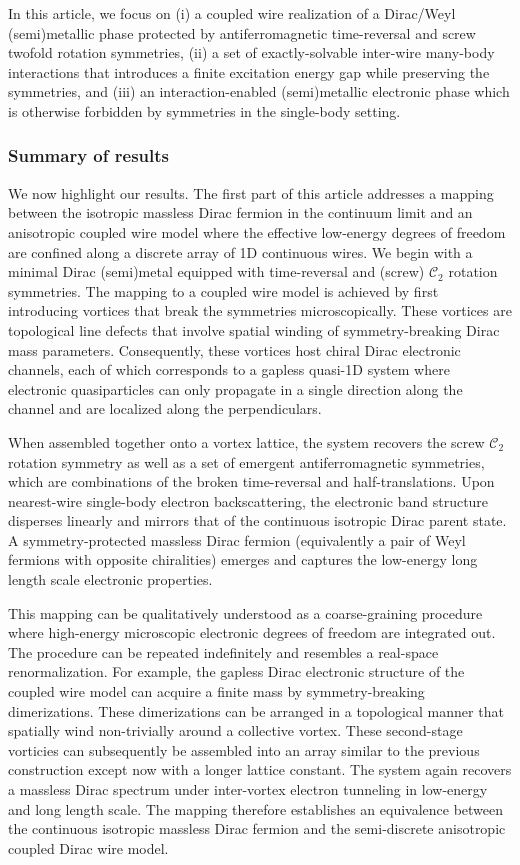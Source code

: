 In this article, we focus on (i) a coupled wire realization of a Dirac/Weyl (semi)metallic phase protected by antiferromagnetic time-reversal and screw twofold rotation symmetries, (ii) a set of exactly-solvable inter-wire many-body interactions that introduces a finite excitation energy gap while preserving the symmetries, and (iii) an interaction-enabled (semi)metallic electronic phase which is otherwise forbidden by symmetries in the single-body setting.

\subsubsection{Summary of results}\label{sec:introsummary}

We now highlight our results. The first part of this article addresses a mapping between the isotropic massless Dirac fermion in the continuum limit and an anisotropic coupled wire model where the effective low-energy degrees of freedom are confined along a discrete array of 1D continuous wires. We begin with a minimal Dirac (semi)metal equipped with time-reversal and (screw) $\mathcal{C}_2$ rotation symmetries. The mapping to a coupled wire model is achieved by first introducing vortices that break the symmetries microscopically. These vortices are topological line defects that involve spatial winding of symmetry-breaking Dirac mass parameters. Consequently, these vortices host chiral Dirac electronic channels, each of which corresponds to a gapless quasi-1D system where electronic quasiparticles can only propagate in a single direction along the channel and are localized along the perpendiculars. 

When assembled together onto a vortex lattice, the system recovers the screw $\mathcal{C}_2$ rotation symmetry as well as a set of emergent antiferromagnetic symmetries, which are combinations of the broken time-reversal and half-translations. Upon nearest-wire single-body electron backscattering, the electronic band structure disperses linearly and mirrors that of the continuous isotropic Dirac parent state. A symmetry-protected massless Dirac fermion (equivalently a pair of Weyl fermions with opposite chiralities) emerges and captures the low-energy long length scale electronic properties.

This mapping can be qualitatively understood as a coarse-graining procedure where high-energy microscopic electronic degrees of freedom are integrated out. The procedure can be repeated indefinitely and resembles a real-space renormalization. For example, the gapless Dirac electronic structure of the coupled wire model can acquire a finite mass by symmetry-breaking dimerizations. These dimerizations can be arranged in a topological manner that spatially wind non-trivially around a collective vortex. These second-stage vorticies can subsequently be assembled into an array similar to the previous construction except now with a longer lattice constant. The system again recovers a massless Dirac spectrum under inter-vortex electron tunneling in low-energy and long length scale. The mapping therefore establishes an equivalence between the continuous isotropic massless Dirac fermion and the semi-discrete anisotropic coupled Dirac wire model.


